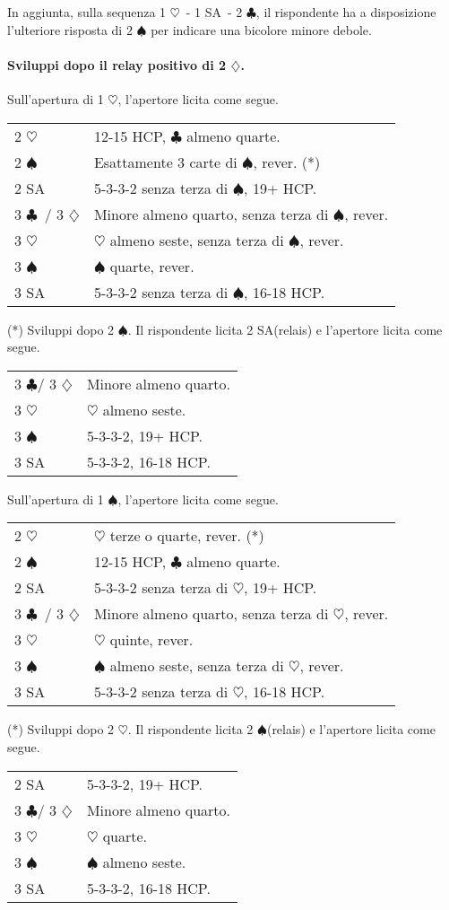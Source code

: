 \documentclass[a4paper,10pt]{article}
\renewcommand{\c}{$\clubsuit$\xspace}
\renewcommand{\d}{$\diamondsuit$\xspace}
\newcommand{\h}{$\heartsuit$\xspace}
\newcommand{\s}{$\spadesuit$\xspace}
\newcommand{\sa}{SA\xspace}
\newcommand{\smallspace}{\vskip0.3cm}
\newenvironment{twocol}
  {\smallspace\noindent\begin{tabular}{l p{0.78\textwidth}}}
  {\end{tabular}\smallspace}
\begin{document}
In aggiunta, sulla sequenza 1 \h\ - 1 \sa\ - 2 \c, il rispondente ha a disposizione l'ulteriore risposta di 2 \s per indicare una bicolore minore debole.

\paragraph{Sviluppi dopo il relay positivo di 2 \d.}
Sull'apertura di 1 \h, l'apertore licita come segue.

\begin{twocol}
  2 \h & 12-15 HCP, \c almeno quarte. \\
  2 \s & Esattamente 3 carte di \s, rever. (*)\\
  2 \sa & 5-3-3-2 senza terza di \s, 19+ HCP. \\
  3 \c\ / 3 \d & Minore almeno quarto, senza terza di \s, rever. \\
  3 \h & \h almeno seste, senza terza di \s, rever. \\
  3 \s & \s quarte, rever. \\
  3 \sa & 5-3-3-2 senza terza di \s, 16-18 HCP.
\end{twocol}

\noindent (*) Sviluppi dopo 2 \s. Il rispondente licita 2 \sa (relais) e l'apertore licita come segue.
\begin{twocol}
  3 \c / 3 \d & Minore almeno quarto. \\
  3 \h & \h almeno seste. \\
  3 \s & 5-3-3-2, 19+ HCP. \\
  3 \sa & 5-3-3-2, 16-18 HCP.
\end{twocol}


\noindent Sull'apertura di 1 \s, l'apertore licita come segue.

\begin{twocol}
  2 \h & \h terze o quarte, rever. (*)\\
  2 \s & 12-15 HCP, \c almeno quarte. \\
  2 \sa & 5-3-3-2 senza terza di \h, 19+ HCP. \\
  3 \c\ / 3 \d & Minore almeno quarto, senza terza di \h, rever. \\
  3 \h & \h quinte, rever. \\
  3 \s & \s almeno seste, senza terza di \h, rever. \\
  3 \sa & 5-3-3-2 senza terza di \h, 16-18 HCP.
\end{twocol}

\noindent (*) Sviluppi dopo 2 \h. Il rispondente licita 2 \s (relais) e l'apertore licita come segue.
\begin{twocol}
  2 \sa & 5-3-3-2, 19+ HCP. \\
  3 \c / 3 \d & Minore almeno quarto. \\
  3 \h & \h quarte. \\
  3 \s & \s almeno seste. \\
  3 \sa & 5-3-3-2, 16-18 HCP.
\end{twocol}
\end{document}
